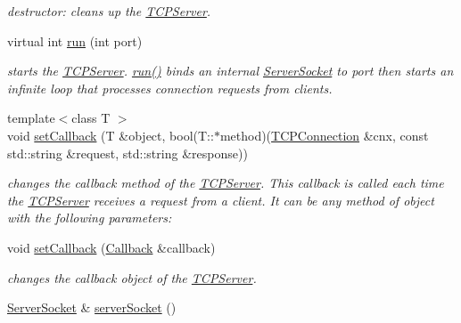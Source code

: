 \begin{DoxyCompactItemize}
\begin{DoxyCompactList}\small\item\em destructor\+: cleans up the \hyperlink{classcppu_1_1_t_c_p_server}{T\+C\+P\+Server}. \end{DoxyCompactList}\item 
virtual int \hyperlink{classcppu_1_1_t_c_p_server_a98e00d62745812b17bdee9f07f2070c4}{run} (int port)
\begin{DoxyCompactList}\small\item\em starts the \hyperlink{classcppu_1_1_t_c_p_server}{T\+C\+P\+Server}. \hyperlink{classcppu_1_1_t_c_p_server_a98e00d62745812b17bdee9f07f2070c4}{run()} binds an internal \hyperlink{classcppu_1_1_server_socket}{Server\+Socket} to {\itshape port} then starts an infinite loop that processes connection requests from clients. \end{DoxyCompactList}\item 
{\footnotesize template$<$class T $>$ }\\void \hyperlink{classcppu_1_1_t_c_p_server_a7d4fdb93439015934004755fde72945b}{set\+Callback} (T \&object, bool(T\+::$\ast$method)(\hyperlink{classcppu_1_1_t_c_p_connection}{T\+C\+P\+Connection} \&cnx, const std\+::string \&request, std\+::string \&response))
\begin{DoxyCompactList}\small\item\em changes the callback method of the \hyperlink{classcppu_1_1_t_c_p_server}{T\+C\+P\+Server}. This callback is called each time the \hyperlink{classcppu_1_1_t_c_p_server}{T\+C\+P\+Server} receives a request from a client. It can be any method of {\itshape object} with the following parameters\+: \end{DoxyCompactList}\item 
void \hyperlink{classcppu_1_1_t_c_p_server_a94d3d97b03d5e3e48609e405d8dd7897}{set\+Callback} (\hyperlink{structcppu_1_1_t_c_p_server_1_1_callback}{Callback} \&callback)
\begin{DoxyCompactList}\small\item\em changes the callback object of the \hyperlink{classcppu_1_1_t_c_p_server}{T\+C\+P\+Server}. \end{DoxyCompactList}\item 
\hypertarget{classcppu_1_1_t_c_p_server_a6428b63a4440045050dba4f33bb454bf}{\hyperlink{classcppu_1_1_server_socket}{Server\+Socket} \& \hyperlink{classcppu_1_1_t_c_p_server_a6428b63a4440045050dba4f33bb454bf}{server\+Socket} ()}\label{classcppu_1_1_t_c_p_server_a6428b63a4440045050dba4f33bb454bf}


\end{DoxyCompactItemize}
